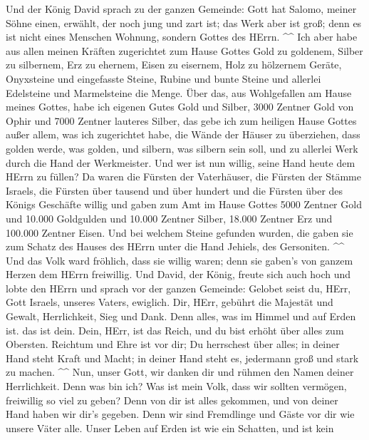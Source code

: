  Und der König David sprach zu der ganzen Gemeinde: Gott
hat Salomo, meiner Söhne einen, erwählt, der noch jung und zart ist; das
Werk aber ist groß; denn es ist nicht eines Menschen Wohnung, sondern
Gottes des HErrn. \^{}\^{}  Ich aber habe aus allen meinen
Kräften zugerichtet zum Hause Gottes Gold zu goldenem, Silber zu
silbernem, Erz zu ehernem, Eisen zu eisernem, Holz zu hölzernem Geräte,
Onyxsteine und eingefasste Steine, Rubine und bunte Steine und allerlei
Edelsteine und Marmelsteine die Menge.  Über das, aus
Wohlgefallen am Hause meines Gottes, habe ich eigenen Gutes Gold und
Silber,  3000 Zentner Gold von Ophir und 7000 Zentner
lauteres Silber, das gebe ich zum heiligen Hause Gottes außer allem, was
ich zugerichtet habe, die Wände der Häuser zu überziehen, 
dass golden werde, was golden, und silbern, was silbern sein soll, und
zu allerlei Werk durch die Hand der Werkmeister. Und wer ist nun willig,
seine Hand heute dem HErrn zu füllen?  Da waren die
Fürsten der Vaterhäuser, die Fürsten der Stämme Israels, die Fürsten
über tausend und über hundert und die Fürsten über des Königs Geschäfte
willig  und gaben zum Amt im Hause Gottes 5000 Zentner
Gold und 10.000 Goldgulden und 10.000 Zentner Silber, 18.000 Zentner Erz
und 100.000 Zentner Eisen.  Und bei welchem Steine
gefunden wurden, die gaben sie zum Schatz des Hauses des HErrn unter die
Hand Jehiels, des Gersoniten. \^{}\^{}  Und das Volk ward
fröhlich, dass sie willig waren; denn sie gaben's von ganzem Herzen dem
HErrn freiwillig. Und David, der König, freute sich auch hoch
 und lobte den HErrn und sprach vor der ganzen Gemeinde:
Gelobet seist du, HErr, Gott Israels, unseres Vaters, ewiglich.
 Dir, HErr, gebührt die Majestät und Gewalt,
Herrlichkeit, Sieg und Dank. Denn alles, was im Himmel und auf Erden
ist. das ist dein. Dein, HErr, ist das Reich, und du bist erhöht über
alles zum Obersten.  Reichtum und Ehre ist vor dir; Du
herrschest über alles; in deiner Hand steht Kraft und Macht; in deiner
Hand steht es, jedermann groß und stark zu machen. \^{}\^{}
 Nun, unser Gott, wir danken dir und rühmen den Namen
deiner Herrlichkeit.  Denn was bin ich? Was ist mein
Volk, dass wir sollten vermögen, freiwillig so viel zu geben? Denn von
dir ist alles gekommen, und von deiner Hand haben wir dir's gegeben.
 Denn wir sind Fremdlinge und Gäste vor dir wie unsere
Väter alle. Unser Leben auf Erden ist wie ein Schatten, und ist kein
